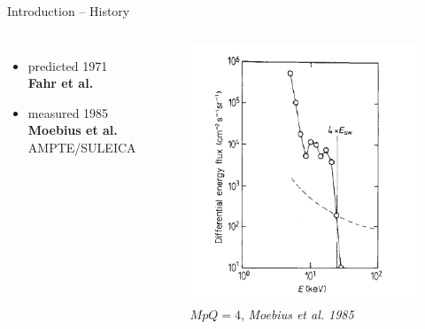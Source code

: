 \documentclass{beamer}
\begin{document}
\begin{frame}{Introduction -- History}
\begin{columns}
	\column{4cm}
		\begin{itemize}
			\item predicted 1971\\ \textbf{Fahr et al.} 
			\item measured 1985\\ \textbf{Moebius et al.} \\ AMPTE/SULEICA
		\end{itemize}
	\column{6.5cm}
		\begin{figure}									
			\includegraphics[scale=0.4]{pictures/moebius2_1985.png}
			\caption{$MpQ = 4$, \scriptsize{\textit{Moebius et al. 1985}}}
			\end{figure}
\end{columns}
\end{frame}
\end{document}
